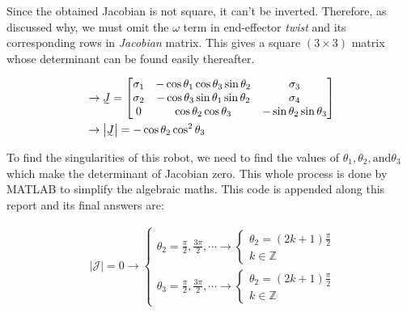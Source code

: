 \documentclass[conference]{IEEEtran}
\begin{document}
Since the obtained Jacobian is not square, it can't be inverted. Therefore, as discussed why, we must omit the $\omega$ term in end-effector \textit{twist} and its corresponding rows in \textit{Jacobian} matrix. This gives a square \((3 \times 3)\) matrix whose determinant can be found easily thereafter.

\begin{align*}
     & \rightarrow  \undertilde{J} =
    \begin{bmatrix}
        \sigma_1 & -\cos  \theta_{1} \cos  \theta_{3} \sin  \theta_{2} & \sigma_3                           \\
        \sigma_2 & -\cos  \theta_{3} \sin  \theta_{1} \sin  \theta_{2} & \sigma_4                           \\
        0        & \cos  \theta_{2} \cos  \theta_{3}                   & -\sin  \theta_{2} \sin  \theta_{3}
    \end{bmatrix} \\
     & \rightarrow  \left|\undertilde{J}\right| = - \cos \theta_2 \cos ^2 \theta_3
\end{align*}

To find the singularities of this robot, we need to find the values of \(\theta_1, \theta_2, \text{and} \theta_3\) which make the determinant of Jacobian zero. This whole process is done by MATLAB to simplify the algebraic maths. This code is appended along this report and its final answers are:
\begin{large}
    \begin{align*}
         & \left|\mathcal{J}\right| = 0 \rightarrow \begin{cases}
                                                        \theta_2 = \frac{\pi}{2}, \frac{3\pi}{2}, \cdots \rightarrow \begin{cases}
                                                                             \theta_2 = (2k+1)\frac{\pi}{2} \\[10pt]
                                                                             k \in \mathbb{Z}
                                                                         \end{cases} \\[30pt]
                                                        \theta_3 = \frac{\pi}{2}, \frac{3\pi}{2}, \cdots \rightarrow \begin{cases}
                                                                             \theta_2 = (2k+1)\frac{\pi}{2} \\[10pt]
                                                                             k \in \mathbb{Z}\end{cases}
                                                    \end{cases}
    \end{align*}
\end{large}
\end{document}

